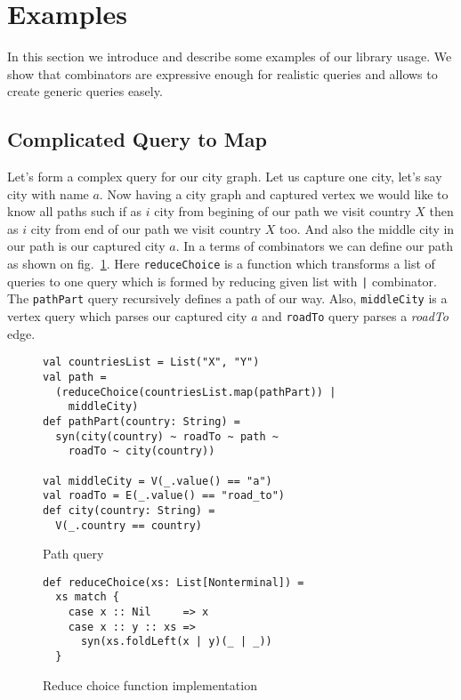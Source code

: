 \section{Examples}
\label{sec:examples}

In this section we introduce and describe some examples of our library usage.
We show that combinators are expressive enough for realistic queries and allows to create generic queries easely.

\subsection{Complicated Query to Map}

Let's form a complex query for our city graph. 
Let us capture one city, let's say city with name $a$. 
Now having a city graph and captured vertex we would like to know all paths such if as $i$ city from begining of our path we visit country $X$ then as $i$ city from end of our path we visit country $X$ too. 
And also the middle city in our path is our captured city $a$.
In a terms of combinators we can define our path as shown on fig.~\ref{fig:pathQuery}.
Here \lstinline{reduceChoice} is a function which transforms a list of queries to one query which is formed by reducing given list with \lstinline{|} combinator.
The \lstinline{pathPart} query recursively defines a path of our way.
Also, \lstinline{middleCity} is a vertex query which parses our captured city $a$ and \lstinline{roadTo} query parses a \emph{roadTo} edge.

\begin{figure}[h]
\begin{lstlisting}
val countriesList = List("X", "Y")
val path = 
  (reduceChoice(countriesList.map(pathPart)) | 
    middleCity)
def pathPart(country: String) =
  syn(city(country) ~ roadTo ~ path ~ 
    roadTo ~ city(country))

val middleCity = V(_.value() == "a")
val roadTo = E(_.value() == "road_to")
def city(country: String) =
  V(_.country == country)
\end{lstlisting}
\caption{Path query}
\label{fig:pathQuery}
\end{figure}

\begin{figure}[h]
\begin{lstlisting}
def reduceChoice(xs: List[Nonterminal]) = 
  xs match {
    case x :: Nil     => x
    case x :: y :: xs => 
      syn(xs.foldLeft(x | y)(_ | _))
  }
\end{lstlisting}
\caption{Reduce choice function implementation}
\label{fig:reduceChoice}
\end{figure}

